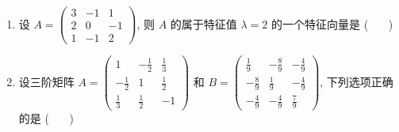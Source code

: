 \begin{enumerate}
	\item 设 $A = \begin{pmatrix} 3 & -1 & 1 \\ 2 & 0 & -1 \\ 1 & -1 & 2 \end{pmatrix}$, 则 $A$ 的属于特征值 $\lambda=2$ 的一个特征向量是 ( \ \ \ )
	\vspace{0.5em}
	
	\item 设三阶矩阵 $A = \begin{pmatrix} 1 & -\frac{1}{2} & \frac{1}{3} \\ -\frac{1}{2} & 1 & \frac{1}{2} \\ \frac{1}{3} & \frac{1}{2} & -1 \end{pmatrix}$ 和 $B = \begin{pmatrix} \frac{1}{9} & -\frac{8}{9} & -\frac{4}{9} \\ -\frac{8}{9} & \frac{1}{9} & -\frac{4}{9} \\ -\frac{4}{9} & -\frac{4}{9} & \frac{7}{9} \end{pmatrix}$, 下列选项正确的是 ( \ \ \ )
	\vspace{0.5em}
	

\end{enumerate}
